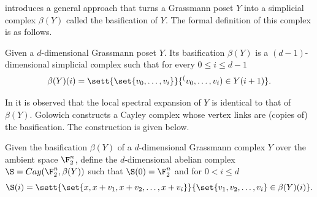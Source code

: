 \medskip

\cite{Golowich2023} introduces a general approach that turns a Grassmann poset $Y$ into a simplicial complex \(\beta(Y)\) called the basification of $Y$. The formal definition of this complex is as follows.

\begin{definition}\label{def:basification}
    Given a $d$-dimensional Grassmann poset $Y$. Its basification $\beta(Y)$ is a $(d-1)$-dimensional simplicial complex such that for every $0\le i \le d-1$
    \[ \beta(Y)(i) = \sett{ \set{v_0,\dots,v_i}}{\sp (v_0,\dots,v_i) \in Y(i+1)}.\]
\end{definition}

In \cite{Golowich2023} it is observed that the local spectral expansion of \(Y\) is identical to that of \(\beta(Y)\). Golowich constructs a Cayley complex whose vertex links are (copies of) the basification. The construction is given below.

\begin{definition}\label{def:abelian-complex-from-basification}
    Given the basification $\beta(Y)$ of a $d$-dimensional Grassmann complex $Y$ over the ambient space $\F_2^n$, define the $d$-dimensional abelian complex $\S = Cay(\F_2^n, \beta(Y))$ such that $\S(0) = \F_2^n$ and for $0<i\le d$
    \[\S(i) = \sett{\set{x,x+v_1,x+v_2,\dots,x+v_i}}{\set{v_1,v_2,\dots,v_i} \in \beta(Y)(i)}.\]
\end{definition}



